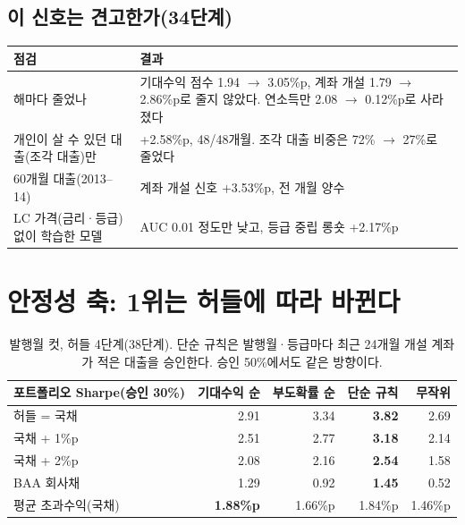 \subsection*{이 신호는 견고한가(34단계)}
\begin{table}[H]\centering\small
\begin{tabularx}{\linewidth}{@{}p{50mm}L@{}}\toprule
점검 & 결과\\\midrule
해마다 줄었나 & 기대수익 점수 1.94 \ensuremath{\to} 3.05\%p, 계좌 개설 1.79 \ensuremath{\to} 2.86\%p로 줄지 않았다. 연소득만 2.08 \ensuremath{\to} 0.12\%p로 사라졌다\\
개인이 살 수 있던 대출(조각 대출)만 & +2.58\%p, 48/48개월. 조각 대출 비중은 72\% \ensuremath{\to} 27\%로 줄었다\\
60개월 대출(2013--14) & 계좌 개설 신호 +3.53\%p, 전 개월 양수\\
LC 가격(금리·\allowbreak{}등급) 없이 학습한 모델 & AUC 0.01 정도만 낮고, 등급 중립 롱숏 +2.17\%p\\\bottomrule
\end{tabularx}
\end{table}

\section{안정성 축: 1위는 허들에 따라 바뀐다}
\begin{table}[H]\centering\small
\begin{tabular}{@{}lrrrr@{}}\toprule
포트폴리오 Sharpe(승인 30\%) & 기대수익 순 & 부도확률 순 & 단순 규칙 & 무작위\\\midrule
허들 = 국채 & 2.91 & 3.34 & \textbf{3.82} & 2.69\\
국채 + 1\%p & 2.51 & 2.77 & \textbf{3.18} & 2.14\\
국채 + 2\%p & 2.08 & 2.16 & \textbf{2.54} & 1.58\\
BAA 회사채 & 1.29 & 0.92 & \textbf{1.45} & 0.52\\\midrule
평균 초과수익(국채) & \textbf{1.88\%p} & 1.66\%p & 1.84\%p & 1.46\%p\\\bottomrule
\end{tabular}
\caption{발행월 컷, 허들 4단계(38단계). 단순 규칙은 발행월·\allowbreak{}등급마다 최근 24개월 개설 계좌가 적은 대출을 승인한다. 승인 50\%에서도 같은 방향이다.}
\end{table}

